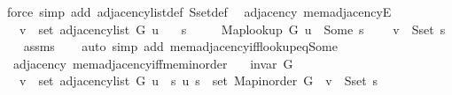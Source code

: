 \begin{isabellebody}
\ {\isacharparenleft}{\kern0pt}force\ simp\ add{\isacharcolon}{\kern0pt}\ adjacency{\isacharunderscore}{\kern0pt}list{\isacharunderscore}{\kern0pt}def\ S{\isachardot}{\kern0pt}set{\isacharunderscore}{\kern0pt}def{\isacharparenright}{\kern0pt}%
\endisatagproof
{\isafoldproof}%
%
\isadelimproof
\isanewline
%
\endisadelimproof
%
\isadeliminvisible
\isanewline
%
\endisadeliminvisible
%
\isataginvisible
{}\isamarkupfalse%
\ {\isacharparenleft}{\kern0pt}\ adjacency{\isacharparenright}{\kern0pt}\ mem{\isacharunderscore}{\kern0pt}adjacencyE{\isacharcolon}{\kern0pt}\isanewline
\ \ \ {\isachardoublequoteopen}v\ {\isasymin}\ set\ {\isacharparenleft}{\kern0pt}adjacency{\isacharunderscore}{\kern0pt}list\ G\ u{\isacharparenright}{\kern0pt}{\isachardoublequoteclose}\isanewline
\ \ \ s\ \isanewline
\ \ \ \ {\isachardoublequoteopen}Map{\isacharunderscore}{\kern0pt}lookup\ G\ u\ {\isacharequal}{\kern0pt}\ Some\ s{\isachardoublequoteclose}\isanewline
\ \ \ \ {\isachardoublequoteopen}v\ {\isasymin}\ S{\isachardot}{\kern0pt}set\ s{\isachardoublequoteclose}%
\endisataginvisible
{\isafoldinvisible}%
%
\isadeliminvisible
\isanewline
%
\endisadeliminvisible
%
\isadelimproof
\ \ %
\endisadelimproof
%
\isatagproof
{}\isamarkupfalse%
\ assms\isanewline
\ \ \isamarkupfalse%
\ {\isacharparenleft}{\kern0pt}auto\ simp\ add{\isacharcolon}{\kern0pt}\ mem{\isacharunderscore}{\kern0pt}adjacency{\isacharunderscore}{\kern0pt}iff{\isacharunderscore}{\kern0pt}lookup{\isacharunderscore}{\kern0pt}eq{\isacharunderscore}{\kern0pt}Some{\isacharparenright}{\kern0pt}%
\endisatagproof
{\isafoldproof}%
%
\isadelimproof
\isanewline
%
\endisadelimproof
%
\isadeliminvisible
\isanewline
%
\endisadeliminvisible
%
\isataginvisible
{}\isamarkupfalse%
\ {\isacharparenleft}{\kern0pt}\ adjacency{\isacharparenright}{\kern0pt}\ mem{\isacharunderscore}{\kern0pt}adjacency{\isacharunderscore}{\kern0pt}iff{\isacharunderscore}{\kern0pt}mem{\isacharunderscore}{\kern0pt}inorder{\isacharcolon}{\kern0pt}\isanewline
\ \ \ {\isachardoublequoteopen}invar\ G{\isachardoublequoteclose}\isanewline
\ \ \ {\isachardoublequoteopen}v\ {\isasymin}\ set\ {\isacharparenleft}{\kern0pt}adjacency{\isacharunderscore}{\kern0pt}list\ G\ u{\isacharparenright}{\kern0pt}\ {\isasymlongleftrightarrow}\ {\isacharparenleft}{\kern0pt}{\isasymexists}s{\isachardot}{\kern0pt}\ {\isacharparenleft}{\kern0pt}u{\isacharcomma}{\kern0pt}\ s{\isacharparenright}{\kern0pt}\ {\isasymin}\ set\ {\isacharparenleft}{\kern0pt}Map{\isacharunderscore}{\kern0pt}inorder\ G{\isacharparenright}{\kern0pt}\ {\isasymand}\ v\ {\isasymin}\ S{\isachardot}{\kern0pt}set\ s{\isacharparenright}{\kern0pt}{\isachardoublequoteclose}%

\end{isabellebody}
